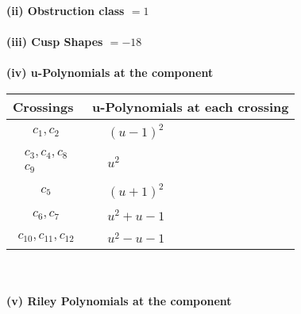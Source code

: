 \documentclass[1p]{elsarticle_modified}
\theoremstyle{definition}
\begin{document}
\flushleft \textbf{(ii) Obstruction class $= 1$}\\~\\
\flushleft \textbf{(iii) Cusp Shapes $= -18$}\\~\\
\newpage\renewcommand{\arraystretch}{1}
\flushleft \textbf{(iv) u-Polynomials at the component}\newline \\
\begin{tabular}{m{50pt}|m{274pt}}
Crossings & \hspace{64pt}u-Polynomials at each crossing \\
\hline $$\begin{aligned}c_{1},c_{2}\end{aligned}$$&$\begin{aligned}
&(u-1)^2
\end{aligned}$\\
\hline $$\begin{aligned}c_{3},c_{4},c_{8}\\c_{9}\end{aligned}$$&$\begin{aligned}
&u^2
\end{aligned}$\\
\hline $$\begin{aligned}c_{5}\end{aligned}$$&$\begin{aligned}
&(u+1)^2
\end{aligned}$\\
\hline $$\begin{aligned}c_{6},c_{7}\end{aligned}$$&$\begin{aligned}
&u^2+u-1
\end{aligned}$\\
\hline $$\begin{aligned}c_{10},c_{11},c_{12}\end{aligned}$$&$\begin{aligned}
&u^2- u-1
\end{aligned}$\\
\hline
\end{tabular}\\~\\
\newpage\renewcommand{\arraystretch}{1}
\flushleft \textbf{(v) Riley Polynomials at the component}\newline \\
\end{document}
